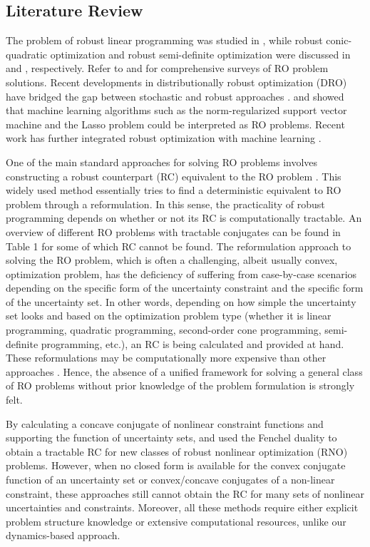 \documentclass[journal,twoside,web]{ieeecolor}
\newcommand{\rev}[1]{\textcolor{revisionblue}{#1}}
\begin{document}
\subsection*{\rev{Literature Review}} The problem of robust linear programming was studied in \cite{bental1999}, while robust conic-quadratic optimization and robust semi-definite optimization were discussed in \cite{bental2002} and \cite{bental1998}, respectively. Refer to \cite{bertsimas2011} and \cite{beyer2007} for \rev{comprehensive} surveys of RO problem solutions. \rev{Recent developments in distributionally robust optimization (DRO) have bridged the gap between stochastic and robust approaches \cite{aigner2023,yang2023}.} \cite{xu2009} and \cite{xu2010} showed that machine learning algorithms such as the norm-regularized support vector machine and the Lasso problem could be interpreted as RO problems. \rev{Recent work has further integrated robust optimization with machine learning \cite{zhu2023zeroth,madry2018adversarial}.}

One of the main standard approaches for solving RO problems involves constructing a robust counterpart (RC) equivalent to the RO problem \cite{bental2009}. This widely used method essentially tries to find a deterministic equivalent to RO problem through a reformulation. In this sense, the practicality of robust programming depends on whether or not its RC is computationally tractable. An overview of different RO problems with tractable conjugates can be found in \cite{gorissen20152} Table 1 for some of which RC cannot be found.
The reformulation approach to solving the RO problem, which is often a challenging, albeit usually convex, optimization problem, has the deficiency of suffering from case-by-case scenarios depending on the specific form of the uncertainty constraint and the specific form of the uncertainty set. In other words, depending on how simple the uncertainty set looks and based on the optimization problem type (whether it is linear programming, quadratic programming, second-order cone programming, semi-definite programming, etc.), an RC is being calculated and provided at hand. These reformulations may be computationally more expensive than other approaches \cite{bertsimas2016}. Hence, the absence of a unified framework for solving a general class of RO problems without prior knowledge of the problem formulation is strongly felt.

By calculating a concave conjugate of nonlinear constraint functions and supporting the function of uncertainty sets, \cite{bental20152} and \cite{gorissen20152} used the Fenchel duality to obtain a tractable RC for new classes of robust nonlinear optimization (RNO) problems. However, when no closed form is available for the convex conjugate function of an uncertainty set or convex/concave conjugates of a non-linear constraint, these approaches still cannot obtain the RC for many sets of nonlinear uncertainties and constraints. \rev{Moreover, all these methods require either explicit problem structure knowledge or extensive computational resources, unlike our dynamics-based approach.}
\end{document}
